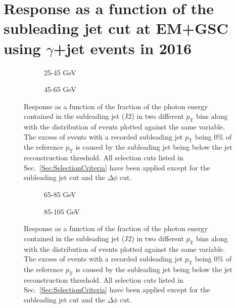 \chapter{Response as a function of the subleading jet cut at EM+GSC using $\gamma$+jet events in 2016}

\begin{figure}[!ht]
\centering
\begin{subfigure}{.5\textwidth}
\centering
{}
\caption{25-45 GeV}
\end{subfigure}%
\begin{subfigure}{.5\textwidth}
\centering
{}
\caption{45-65 GeV}
\end{subfigure}
  \caption[Response as a function of the subleading jet cut, 25-45 and 45-65 GeV bins]
  {\small Response as a function of the fraction of the photon energy contained in the subleading jet (J2) in two different $p_{\mathrm T}$ bins along with the distribution of events plotted against the same variable.  The excess of events with a recorded subleading jet $p_{\mathrm T}$ being 0\% of the reference $p_{\mathrm T}$ is caused by the subleading jet being below the jet reconstruction threshold.  All selection cuts listed in Sec.~\ref{Sec:SelectionCriteria} have been applied except for the subleading jet cut and the $\Delta\phi$ cut.  }
  \label{plot:GJetEMJ225-45_2016App}
\end{figure}

\begin{figure}[!ht]
  \centering
  \begin{subfigure}{.5\textwidth}
    \centering
    \caption{65-85 GeV}
  \end{subfigure}%
  \begin{subfigure}{.5\textwidth}
    \centering
    \caption{85-105 GeV}
  \end{subfigure}
  \caption[Response as a function of the subleading jet cut, 65-85 and 85-105 GeV bins]
  {\small Response as a function of the fraction of the photon energy contained in the subleading jet (J2) in two different $p_{\mathrm T}$ bins along with the distribution of events plotted against the same variable.  The excess of events with a recorded subleading jet $p_{\mathrm T}$ being 0\% of the reference $p_{\mathrm T}$ is caused by the subleading jet being below the jet reconstruction threshold.  All selection cuts listed in Sec.~\ref{Sec:SelectionCriteria} have been applied except for the subleading jet cut and the $\Delta\phi$ cut.  }
  \label{plot:GJetEMJ265-85_2016App}
\end{figure}

